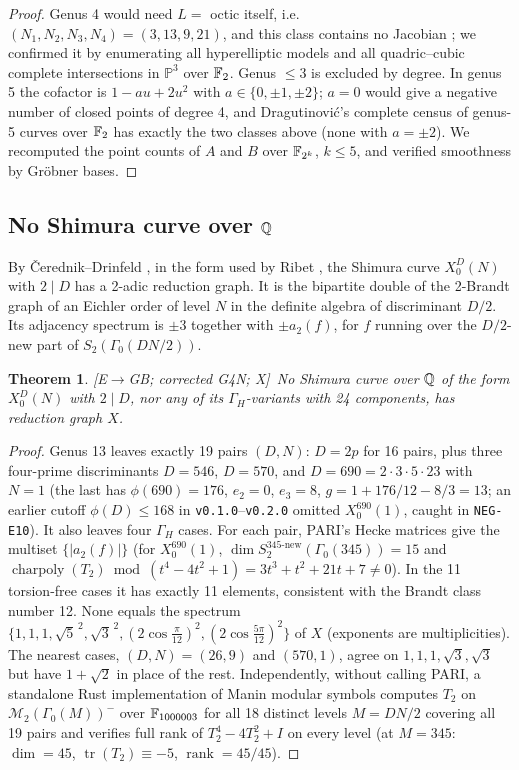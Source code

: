 \documentclass[11pt]{amsart}
\numberwithin{equation}{section}
\theoremstyle{plain}
\newtheorem{theorem}{Theorem}[section]
\theoremstyle{definition}\newtheorem{definition}[theorem]{Definition}
\theoremstyle{remark}\newtheorem{remark}[theorem]{Remark}
\newcommand{\ctag}[1]{\textup{\textsf{\scriptsize[#1]}}}
\begin{document}
\begin{proof}
Genus 4 would need $L=$ octic itself, i.e.\ $(N_1,N_2,N_3,N_4)=(3,13,9,21)$, and this class contains no Jacobian \cite{lmfdb}; we confirmed it by enumerating all hyperelliptic models and all quadric--cubic complete intersections in $\mathbb P^3$ over $\mathbb{F}_2$. Genus $\le3$ is excluded by degree. In genus 5 the cofactor is $1-au+2u^2$ with $a\in\{0,\pm1,\pm2\}$; $a=0$ would give a negative number of closed points of degree 4, and Dragutinovi\'c's complete census of genus-5 curves over $\mathbb{F}_2$ \cite{dragutinovic24} has exactly the two classes above (none with $a=\pm2$). We recomputed the point counts of $A$ and $B$ over $\mathbb{F}_{2^k}$, $k\le5$, and verified smoothness by Gr\"obner bases.
\end{proof}

\subsection{\texorpdfstring{No Shimura curve over $\mathbb{Q}$}{No Shimura curve over Q}}\label{sec:shimura}
By \v{C}erednik--Drinfeld \cite{cerednik76,drinfeld76}, in the form used by Ribet \cite{ribet90}, the Shimura curve $X_0^D(N)$ with $2\mid D$ has a 2-adic reduction graph. It is the bipartite double of the 2-Brandt graph of an Eichler order of level $N$ in the definite algebra of discriminant $D/2$. Its adjacency spectrum is $\pm3$ together with $\pm a_2(f)$, for $f$ running over the $D/2$-new part of $S_2(\Gamma_0(DN/2))$.
\begin{theorem}\label{thm:noshimura}
\ctag{E$\to$GB; corrected G4N; X}\ No Shimura curve over $\mathbb{Q}$ of the form $X_0^D(N)$ with $2\mid D$, nor any of its $\Gamma_H$-variants with 24 components, has reduction graph $X$.
\end{theorem}
\begin{proof}
Genus 13 leaves exactly 19 pairs $(D,N)$: $D=2p$ for 16 pairs, plus three four-prime discriminants $D=546$, $D=570$, and $D=690=2\cdot3\cdot5\cdot23$ with $N=1$ (the last has $\phi(690)=176$, $e_2=0$, $e_3=8$, $g=1+176/12-8/3=13$; an earlier cutoff $\phi(D)\le168$ in \texttt{v0.1.0}--\texttt{v0.2.0} omitted $X_0^{690}(1)$, caught in \texttt{NEG-E10}). It also leaves four $\Gamma_H$ cases. For each pair, PARI's Hecke matrices give the multiset $\{|a_2(f)|\}$ (for $X_0^{690}(1)$, $\dim S_2^{345\text{-new}}(\Gamma_0(345))=15$ and $\operatorname{charpoly}(T_2)\bmod(t^4-4t^2+1)=3t^3+t^2+21t+7\neq0$). In the 11 torsion-free cases it has exactly 11 elements, consistent with the Brandt class number 12. None equals the spectrum $\{1,1,1,\sqrt5^{\,2},\sqrt3^{\,2},(2\cos\frac\pi{12})^2,(2\cos\frac{5\pi}{12})^2\}$ of $X$ (exponents are multiplicities). The nearest cases, $(D,N)=(26,9)$ and $(570,1)$, agree on $1,1,1,\sqrt3,\sqrt3$ but have $1+\sqrt2$ in place of the rest. Independently, without calling PARI, a standalone Rust implementation of Manin modular symbols computes $T_2$ on $\mathcal M_2(\Gamma_0(M))^-$ over $\mathbb{F}_{1000003}$ for all 18 distinct levels $M=DN/2$ covering all 19 pairs and verifies full rank of $T_2^4-4T_2^2+I$ on every level (at $M=345$: $\dim=45$, $\operatorname{tr}(T_2)\equiv-5$, $\operatorname{rank}=45/45$).
\end{proof}
\end{document}
